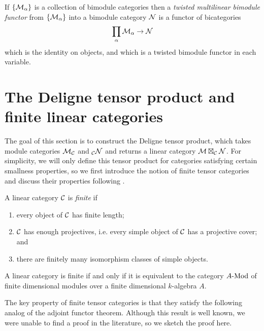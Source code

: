 \documentclass{amsart}
\begin{document}
If $\{ \mathcal M_\alpha \}$ is a collection of bimodule categories then a {\em twisted multilinear bimodule functor} from $\{ \mathcal M_\alpha \}$ into a bimodule category $\mathcal N$ is a functor of bicategories
\begin{equation*}
	\prod_{\alpha} \mathcal M_\alpha \to \mathcal N
\end{equation*}
which is the identity on objects, and which is a twisted bimodule functor in each variable. 

\section{The Deligne tensor product and finite linear categories} \label{sec-tc-deligne}

The goal of this section is to construct the Deligne tensor product, which takes module categories $\mathcal M_\mathcal C$ and ${}_\mathcal C \mathcal N$ and returns a linear category $\mathcal M \boxtimes_\mathcal C \mathcal N$. For simplicity, we will only define this tensor product for categories satisfying certain smallness properties, so we first introduce the notion of finite tensor categories and discuss their properties following \cite{MR2119143, EGNO}.

\begin{definition} %
	A linear category $\mathcal C$ is {\em finite} if 
	\begin{enumerate}
		\item every object of $\mathcal C$ has finite length;
		\item $\mathcal C$ has enough projectives, i.e. every simple object of $\mathcal C$ has a projective cover; and
		\item there are finitely many isomorphism classes of simple objects.  
	\end{enumerate}
\end{definition}

\begin{remark}
A linear category is finite if and only if it is equivalent to the category $\Mod{A}{}$ of finite dimensional modules over a finite dimensional $k$-algebra $A$.
\end{remark}

The key property of finite tensor categories is that they satisfy the following analog of the adjoint functor theorem.  Although this result is well known, we were unable to find a proof in the literature, so we sketch the proof here.
\end{document}
